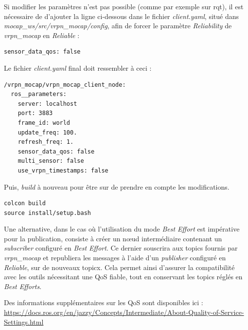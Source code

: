 Si modifier les paramètres n'est pas possible (comme par exemple sur rqt), il est nécessaire de d'ajouter la ligne ci-dessous dans le fichier \textit{client.yaml}, situé dans \textit{mocap\_ws/src/vrpn\_mocap/config}, afin de forcer le paramètre \textit{Reliability} de \textit{vrpn\_mocap} en \textit{Reliable} :

\begin{lstlisting}[style=commandstyle]
sensor_data_qos: false
\end{lstlisting}

\noindent Le fichier \textit{client.yaml} final doit ressembler à ceci :

\begin{lstlisting}[style=commandstyle]
/vrpn_mocap/vrpn_mocap_client_node:
  ros__parameters:
    server: localhost
    port: 3883
    frame_id: world
    update_freq: 100.
    refresh_freq: 1.
    sensor_data_qos: false
    multi_sensor: false
    use_vrpn_timestamps: false
\end{lstlisting}

\noindent 
Puis, \textit{build} à nouveau pour être sur de prendre en compte les modifications.
\begin{lstlisting}[style=commandstyle]
colcon build
source install/setup.bash
\end{lstlisting}


Une alternative, dans le cas où l'utilisation du mode \textit{Best Effort} est impérative pour la publication, consiste à créer un nœud intermédiaire contenant un \textit{subscriber} configuré en \textit{Best Effort}. Ce dernier souscrira aux topics fournis par \textit{vrpn\_mocap} et republiera les messages à l’aide d’un \textit{publisher} configuré en \textit{Reliable}, sur de nouveaux topicx. Cela permet ainsi d'assurer la compatibilité avec les outils nécessitant une QoS fiable, tout en conservant les topics réglés en \textit{Best Efforts}.

Des informations supplémentaires sur les QoS sont disponibles ici : \newline
\url{https://docs.ros.org/en/jazzy/Concepts/Intermediate/About-Quality-of-Service-Settings.html}
